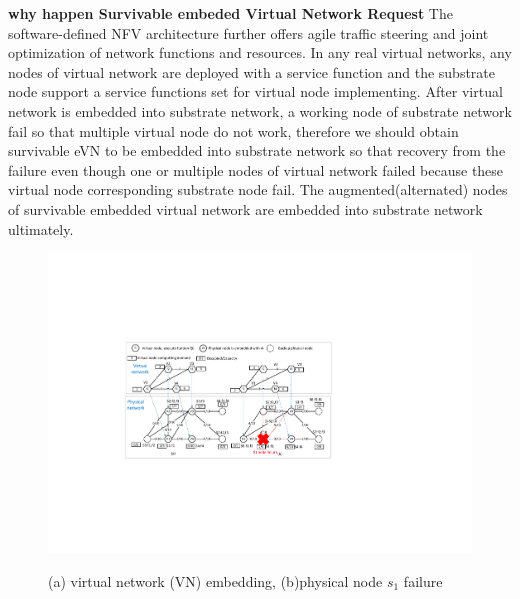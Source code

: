 \textbf{why happen Survivable embeded Virtual Network Request} The software-defined NFV architecture further offers agile traffic steering and joint optimization of network functions and resources.
In any real virtual networks, any nodes of virtual network  are deployed with a service function and the substrate node support a service functions set for virtual node implementing. After virtual network is embedded into substrate network, a working node of substrate network fail so that  multiple virtual node do not work, therefore we should obtain survivable eVN to be embedded into substrate network so that recovery from the failure even though one or multiple nodes of virtual network failed because these virtual node corresponding substrate node fail. The augmented(alternated) nodes of survivable embedded virtual network are embedded into substrate network ultimately.

\begin{figure}
  \centering
  \includegraphics[width=5in]{Fig/VNmapSN}\\
  \caption{(a) virtual network (VN) embedding, (b)physical node $s_1$ failure}\label{fig:VNmapSN}
\end{figure}



